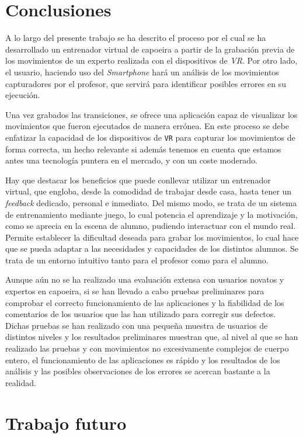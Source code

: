 \section{Conclusiones}

A lo largo del presente trabajo se ha descrito el proceso por el cual se ha desarrollado un entrenador virtual de capoeira a partir de la grabación previa de los movimientos de un experto realizada con el dispositivos de \textit{VR}. Por otro lado, el usuario, haciendo uso del \textit{Smartphone} hará un análisis de los movimientos capturadores por el profesor, que servirá para identificar posibles errores en su ejecución.

Una vez grabados las transiciones, se ofrece una aplicación capaz de visualizar los movimientos que fueron ejecutados de manera errónea. En este proceso se debe enfatizar la capacidad de los dispositivos de \texttt{VR} para capturar los movimientos de forma correcta, un hecho relevante si además tenemos en cuenta que estamos antes una tecnología puntera en el mercado, y con un coste moderado.

Hay que destacar los beneficios que puede conllevar utilizar un entrenador virtual, que engloba, desde la comodidad de trabajar desde casa, hasta tener un \textit{feedback} dedicado, personal e inmediato. Del mismo modo, se trata de un sistema de entrenamiento mediante juego, lo cual potencia el aprendizaje y la motivación, como se aprecia en la escena de alumno, pudiendo interactuar con el mundo real. Permite establecer la dificultad deseada para grabar los movimientos, lo cual hace que se pueda adaptar a las necesidades y capacidades de los distintos alumnos. Se trata de un entorno intuitivo tanto para el profesor como para el alumno. 

Aunque aún no se ha realizado una evaluación extensa con usuarios novatos y expertos en capoeira, si se han llevado a cabo pruebas preliminares para comprobar el correcto funcionamiento de las aplicaciones y la fiabilidad de los comentarios de los usuarios que las han utilizado para corregir sus defectos. Dichas pruebas se han realizado con una pequeña muestra de usuarios de distintos niveles y los resultados preliminares muestran que, al nivel al que se han realizado las pruebas y con movimientos no excesivamente complejos de cuerpo entero, el funcionamiento de las aplicaciones es rápido y los resultados de los análisis y las posibles observaciones de los errores se acercan bastante a la realidad.

\section{Trabajo futuro}

